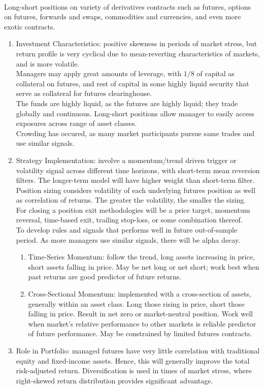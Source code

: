 \begin{remark} \\
Long-short positions on variety of derivatives contracts such as futures, options on futures, forwards and swaps, commodities and currencies, and even more exotic contracts.
\begin{enumerate}[label=\roman*.]
\setlength{\itemsep}{0pt}
\item Investment Characteristics: positive skewness in periods of market stress, but return profile is very cyclical due to mean-reverting characteristics of markets, and is more volatile.\\
Managers may apply great amounts of leverage, with $1/8$ of capital as collateral on futures, and rest of capital in some highly liquid security that serve as collateral for futures clearinghouse.\\
The funds are highly liquid, as the futures are highly liquid; they trade globally and continuous. Long-short positions allow manager to easily access exposures across range of asset classes.\\
Crowding has occured, as many market participants pursue same trades and use similar signals.
\item Strategy Implementation: involve a momentum/trend driven trigger or volatility signal across different time horizons, with short-term mean reversion filters. The longer-term model will have higher weight than short-term filter. Position sizing considers volatility of each underlying futures position as well as correlation of returns. The greater the volatility, the smaller the sizing.\\
For closing a position exit methodologies will be a price target, momentum reversal, time-based exit, trailing stop-loss, or some combination thereof.\\
To develop rules and signals that performs well in future out-of-sample period. As more managers use similar signals, there will be alpha decay.
\begin{enumerate}[label=\arabic*.]
\setlength{\itemsep}{0pt}
\item Time-Series Momentum: follow the trend, long assets increasing in price, short assets falling in price. May be net long or net short; work best when past returns are good predictor of future returns.
\item Cross-Sectional Momentum: implemented with a cross-section of assets, generally within an asset class. Long those rising in price, short those falling in price. Result in net zero or market-neutral position. Work well when market's relative performance to other markets is reliable predictor of future performance. May be constrained by limited futures contracts.
\end{enumerate}
\item Role in Portfolio: managed futures have very little correlation with traditional equity and fixed-income assets. Hence, this will generally improve the total risk-adjusted return. Diversification is used in times of market stress, where right-skewed return distribution provides significant advantage.
\end{enumerate}
\end{remark}

